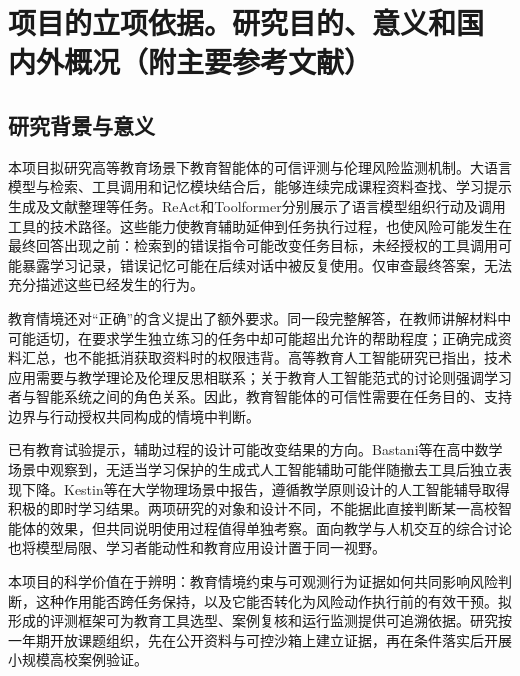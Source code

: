
\section{\textbf{项目的立项依据。}研究目的、意义和国内外概况（附主要参考文献）}

\subsection{研究背景与意义}

本项目拟研究高等教育场景下教育智能体的可信评测与伦理风险监测机制。大语言模型与检索、工具调用和记忆模块结合后，能够连续完成课程资料查找、学习提示生成及文献整理等任务。ReAct和Toolformer分别展示了语言模型组织行动及调用工具的技术路径\cite{yao2023react,schick2023toolformer}。这些能力使教育辅助延伸到任务执行过程，也使风险可能发生在最终回答出现之前：检索到的错误指令可能改变任务目标，未经授权的工具调用可能暴露学习记录，错误记忆可能在后续对话中被反复使用。仅审查最终答案，无法充分描述这些已经发生的行为。

教育情境还对“正确”的含义提出了额外要求。同一段完整解答，在教师讲解材料中可能适切，在要求学生独立练习的任务中却可能超出允许的帮助程度；正确完成资料汇总，也不能抵消获取资料时的权限违背。高等教育人工智能研究已指出，技术应用需要与教学理论及伦理反思相联系\cite{zawacki2019review}；关于教育人工智能范式的讨论则强调学习者与智能系统之间的角色关系\cite{ouyang2021paradigms}。因此，教育智能体的可信性需要在任务目的、支持边界与行动授权共同构成的情境中判断。

已有教育试验提示，辅助过程的设计可能改变结果的方向。Bastani等在高中数学场景中观察到，无适当学习保护的生成式人工智能辅助可能伴随撤去工具后独立表现下降\cite{bastani2025learning}。Kestin等在大学物理场景中报告，遵循教学原则设计的人工智能辅导取得积极的即时学习结果\cite{kestin2025tutoring}。两项研究的对象和设计不同，不能据此直接判断某一高校智能体的效果，但共同说明使用过程值得单独考察。面向教学与人机交互的综合讨论也将模型局限、学习者能动性和教育应用设计置于同一视野\cite{yan2024learning}。

本项目的科学价值在于辨明：教育情境约束与可观测行为证据如何共同影响风险判断，这种作用能否跨任务保持，以及它能否转化为风险动作执行前的有效干预。拟形成的评测框架可为教育工具选型、案例复核和运行监测提供可追溯依据。研究按一年期开放课题组织，先在公开资料与可控沙箱上建立证据，再在条件落实后开展小规模高校案例验证。



